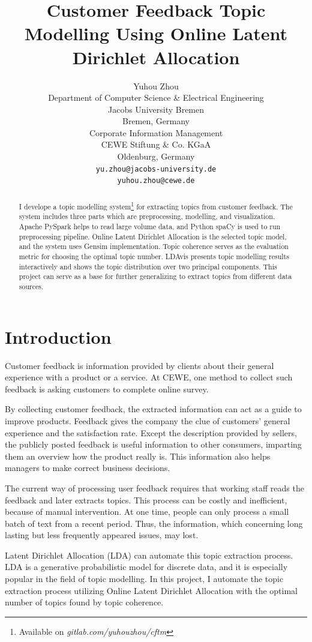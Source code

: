 \documentclass{article} %
\title{Customer Feedback Topic Modelling Using Online Latent Dirichlet Allocation}
\author{
Yuhou Zhou\\
Department of Computer Science \& Electrical Engineering\\
Jacobs University Bremen\\
Bremen, Germany\\
Corporate Information Management\\
CEWE Stiftung \& Co. KGaA\\
Oldenburg, Germany\\
\texttt{yu.zhou@jacobs-university.de}\\
\texttt{yuhou.zhou@cewe.de}\\
}
\begin{document}
\raggedbottom
\maketitle

\begin{abstract}
   I develope a topic modelling system\footnote{Available on \textit{gitlab.com/yuhouzhou/cftm}} for extracting topics from customer feedback. The system includes three parts which are preprocessing, modelling, and visualization. Apache PySpark helps to read large volume data, and Python spaCy is used to run preprocessing pipeline. Online Latent Dirichlet Allocation is the selected topic model, and the system uses Gensim implementation. Topic coherence serves as the evaluation metric for choosing the optimal topic number. LDAvis presents topic modelling results interactively and shows the topic distribution over two principal components. This project can serve as a base for further generalizing to extract topics from different data sources.
\end{abstract}

\section{Introduction}

Customer feedback is information provided by clients about their general experience
with a product or a service. At CEWE, one method to collect such feedback is asking
customers to complete online survey.

By collecting customer feedback, the extracted information can act as a guide to
improve products. Feedback gives the company the clue of customers' general experience
and the satisfaction rate. Except the description provided by sellers, the publicly
posted feedback is useful information to other consumers, imparting them an overview
how the product really is. This information also helps managers to make correct business
decisions.

The current way of processing user feedback requires that working staff reads the
feedback and later extracts topics. This process can be costly and inefficient,
because of manual intervention. At one time, people can only process a small batch of
text from a recent period. Thus, the information, which concerning long lasting but
less frequently appeared issues, may lost. 

Latent Dirichlet Allocation (LDA) can automate this topic extraction process. LDA is a generative probabilistic model for discrete data, and it is especially popular in the field of topic modelling.
In this project, I automate the topic extraction process utilizing Online Latent Dirichlet Allocation with the optimal number of topics found by topic coherence.
\end{document}
